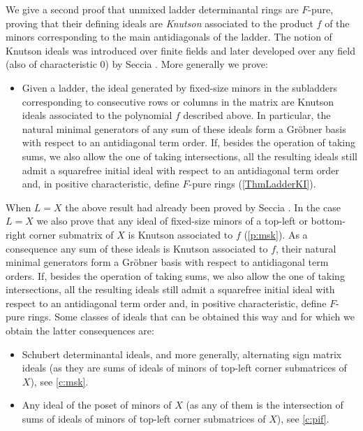 \documentclass[12pt]{amsart}
\theoremstyle{definition}
\renewcommand{\(}{\left(}
\renewcommand{\)}{\right)}
\renewcommand{\!}[1]{{\color{red}\text{\Huge$\star$ }#1}}
\begin{document}
We give a second proof that unmixed ladder determinantal rings are $F$-pure, proving that their defining ideals are {\it Knutson}  associated to the product $f$ of the minors corresponding to  the main antidiagonals of the ladder. The notion of Knutson ideals  was  introduced   over finite fields  \cite{knutson2009frobenius} and later developed over any field (also of characteristic 0) by Seccia \cite{seccia2021knutson}. More generally we prove:
\begin{itemize}
	\item Given a ladder, the ideal generated by fixed-size minors in the subladders corresponding to consecutive rows or columns in the matrix are Knutson ideals associated to the  polynomial $f$ described above. In particular, the natural minimal generators of any sum of these ideals form a Gr\"obner basis with respect to an antidiagonal term order. If, besides the operation of taking sums, we also allow the one of taking intersections, all the resulting ideals still admit a squarefree initial ideal with respect to an antidiagonal term order and, in positive characteristic, define $F$-pure rings (\autoref{ThmLadderKI}). 
\end{itemize}
When $L=X$ the above result had already been proved by Seccia  \cite{seccia2022knutson}. In the case $L=X$ we also prove that any ideal of fixed-size minors of a top-left or bottom-right corner submatrix of $X$ is Knutson associated to $f$ (\autoref{p:msk}). As a consequence any sum of these ideals is  Knutson associated to $f$,  their natural minimal generators  form a Gr\"obner basis with respect  to antidiagonal term orders. If, besides the operation of taking sums, we also allow the one of taking intersections, all the resulting ideals still admit a squarefree initial ideal with respect to an antidiagonal term order and, in positive characteristic, define $F$-pure rings. Some classes of ideals that can be obtained this way and for which we obtain the latter consequences  are: %
\begin{itemize}
	\item Schubert determinantal ideals, and more generally, alternating sign matrix ideals (as they are sums of ideals of minors of top-left corner submatrices of $X$), see %
	\autoref{c:msk}.
	\item Any ideal of the poset of minors of $X$ (as any of them is the intersection of sums of ideals of minors of top-left corner submatrices of $X$), see  %
	\autoref{c:pif}. %
\end{itemize}
\end{document}
